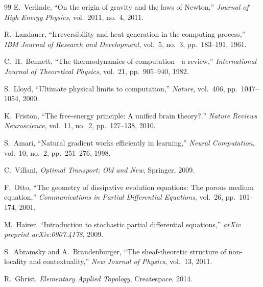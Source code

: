 \documentclass[12pt,oneside]{article}
\theoremstyle{plain}
\theoremstyle{definition}
\theoremstyle{remark}
\begin{document}
\begin{thebibliography}{99}
E.~Verlinde,
\newblock ``On the origin of gravity and the laws of Newton,''
\newblock \emph{Journal of High Energy Physics}, vol.~2011, no.~4, 2011.

R.~Landauer,
\newblock ``Irreversibility and heat generation in the computing process,''
\newblock \emph{IBM Journal of Research and Development}, vol.~5, no.~3,
  pp.~183--191, 1961.

C.~H.~Bennett,
\newblock ``The thermodynamics of computation---a review,''
\newblock \emph{International Journal of Theoretical Physics}, vol.~21,
  pp.~905--940, 1982.

S.~Lloyd,
\newblock ``Ultimate physical limits to computation,''
\newblock \emph{Nature}, vol.~406, pp.~1047--1054, 2000.

K.~Friston,
\newblock ``The free-energy principle: A unified brain theory?,''
\newblock \emph{Nature Reviews Neuroscience}, vol.~11, no.~2, pp.~127--138,
  2010.

S.~Amari,
\newblock ``Natural gradient works efficiently in learning,''
\newblock \emph{Neural Computation}, vol.~10, no.~2, pp.~251--276, 1998.

C.~Villani,
\newblock \emph{Optimal Transport: Old and New},
\newblock Springer, 2009.

F.~Otto,
\newblock ``The geometry of dissipative evolution equations: The porous medium
  equation,''
\newblock \emph{Communications in Partial Differential Equations}, vol.~26,
  pp.~101--174, 2001.

M.~Hairer,
\newblock ``Introduction to stochastic partial differential equations,''
\newblock \emph{arXiv preprint arXiv:0907.4178}, 2009.

S.~Abramsky and A.~Brandenburger,
\newblock ``The sheaf-theoretic structure of non-locality and contextuality,''
\newblock \emph{New Journal of Physics}, vol.~13, 2011.

R.~Ghrist,
\newblock \emph{Elementary Applied Topology},
\newblock Createspace, 2014.

\end{thebibliography}
\end{document}
